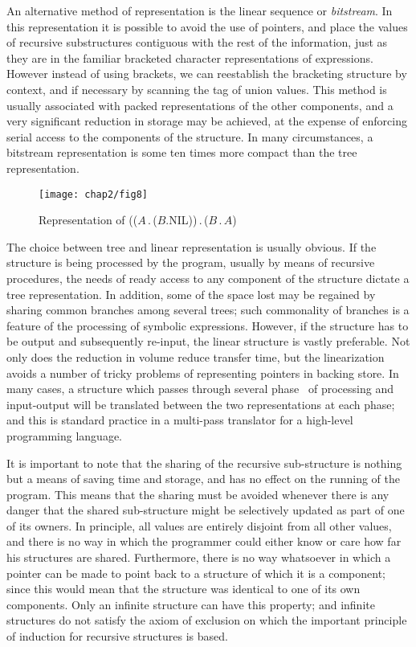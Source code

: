 An alternative method of representation is the linear sequence or \textit{bitstream}. In this representation it is possible to avoid the use of pointers, and place the values of recursive substructures contiguous with the rest of the information, just as they are in the familiar bracketed character representations of expressions. However instead of using brackets, we can reestablish the bracketing structure by context, and if necessary by scanning the tag of union values. This method is usually associated with packed representations of the other components, and a very significant reduction in storage may be achieved, at the expense of enforcing serial access to the components of the structure. In many circumstances, a bitstream representation is some ten times more compact than the tree representation.

\begin{figure}[h]
	\centering
	\texttt{[image: chap2/fig8]}
	\caption{Representation of (($A$\,.\,($B$.NIL))\,.\,($B$\,.\,$A$)}
\end{figure}

The choice between tree and linear representation is usually obvious. If the structure is being processed by the program, usually by means of recursive procedures, the needs of ready access to any component of the structure dictate a tree representation. In addition, some of the space lost may be regained by sharing common branches among several trees; such commonality of branches is a feature of the processing of symbolic expressions. However, if the structure has to be output and subsequently re-input, the linear structure is vastly preferable. Not only does the reduction in volume reduce transfer time, but the linearization avoids a number of tricky problems of representing pointers in backing store. In many cases, a structure which passes through several phase~ of processing and input-output will be translated between the two representations at each phase; and this is standard practice in a multi-pass translator for a high-level programming language.

It is important to note that the sharing of the recursive sub-structure is nothing but a means of saving time and storage, and has no effect on the running of the program. This means that the sharing must be avoided whenever there is any danger that the shared sub-structure might be selectively updated as part of one of its owners. In principle, all values are entirely disjoint from all other values, and there is no way in which the programmer could either know or care how far his structures are shared. Furthermore, there is no way whatsoever in which a pointer can be made to point back to a structure of which it is a component; since this would mean that the structure was identical to one of its own components. Only an infinite structure can have this property; and infinite structures do not satisfy the axiom of exclusion on which the important principle of induction for recursive structures is based.

